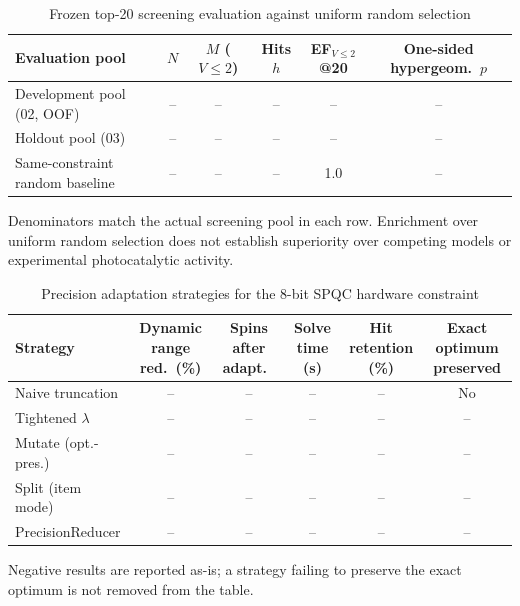 \begin{table}[htbp]
  \centering
  \caption{Frozen top-20 screening evaluation against uniform random selection}
  \label{tab:enrichment_stats}
  \begin{tabular}{lccccc}
    \toprule
    Evaluation pool & $N$ & $M$ ($V\le2$) & Hits $h$ & EF$_{V\le2}$@20 & One-sided hypergeom.\ $p$ \\
    \midrule
    Development pool (02, OOF) & -- & -- & -- & -- & -- \\
    Holdout pool (03)          & -- & -- & -- & -- & -- \\
    Same-constraint random baseline & -- & -- & -- & 1.0 & -- \\
    \bottomrule
  \end{tabular}
  \begin{minipage}{\linewidth}\vspace{2pt}\footnotesize
    Denominators match the actual screening pool in each row.
    Enrichment over uniform random selection does not establish superiority
    over competing models or experimental photocatalytic activity.
  \end{minipage}
\end{table}

\begin{table}[htbp]
  \centering
  \caption{Precision adaptation strategies for the 8-bit SPQC hardware constraint}
  \label{tab:precision_strategies}
  \begin{tabular}{lccccc}
    \toprule
    Strategy & Dynamic range red.\ (\%) & Spins after adapt.\ & Solve time (s) & Hit retention (\%) & Exact optimum preserved \\
    \midrule
    Naive truncation      & -- & -- & -- & -- & No \\
    Tightened $\lambda$   & -- & -- & -- & -- & -- \\
    Mutate (opt.-pres.)   & -- & -- & -- & -- & -- \\
    Split (item mode)     & -- & -- & -- & -- & -- \\
    PrecisionReducer      & -- & -- & -- & -- & -- \\
    \bottomrule
  \end{tabular}
  \begin{minipage}{\linewidth}\vspace{2pt}\footnotesize
    Negative results are reported as-is; a strategy failing to preserve the exact
    optimum is not removed from the table.
  \end{minipage}
\end{table}
